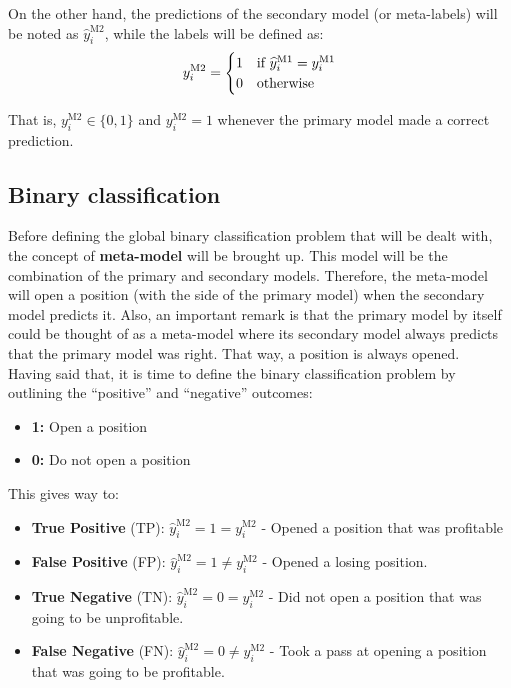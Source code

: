 \documentclass[a4paper]{report}
\begin{document}
On the other hand, the predictions of the secondary model (or meta-labels) 
will be noted as $\widehat{y}_i^{\text{M2}}$, while the labels will be 
defined as:
\begin{equation*}
	y_i^{\text{M2}} =
    \begin{cases}
      1 & \text{if}\ \widehat{y}_i^{\text{M1}} = 
      y_i^{\text{M1}}\\
      \hfill 0 & \text{otherwise} 
    \end{cases}
\end{equation*}

That is, $y_i^{\text{M2}} \in \{0,1\}$ and $y_i^{\text{M2}} = 1$ whenever 
the primary model made a correct prediction.

\subsection{Binary classification}
Before defining the global binary classification problem that will be dealt 
with, the concept of \textbf{meta-model} will be brought up. This model will 
be the combination of the primary and secondary models. Therefore, the 
meta-model will open a position (with the side of the primary model) when 
the secondary model predicts it. Also, an important remark is that the 
primary model by itself could be thought of as a meta-model where its 
secondary model always predicts that the primary model was right. That way, 
a position is always opened.\\

Having said that, it is time to define the binary classification problem by 
outlining the ``positive'' and ``negative'' outcomes:
\begin{itemize}
	\item \textbf{1:} Open a position
	\item \textbf{0:} Do not open a position
\end{itemize}

This gives way to:
\begin{itemize}
	\item \textbf{True Positive} (TP):
	$\widehat{y}^{\text{M2}}_i = 1 = y^{\text{M2}}_i$ - Opened a position 
	that was profitable
		
	\item \textbf{False Positive} (FP): 
	$\widehat{y}^{\text{M2}}_i = 1 \neq y^{\text{M2}}_i$ - Opened a losing 
	position.
	
	\item \textbf{True Negative} (TN):
	$\widehat{y}^{\text{M2}}_i = 0 = y^{\text{M2}}_i$ - Did not open a 
	position that was going to be unprofitable.
	
	\item \textbf{False Negative} (FN): 
	$\widehat{y}^{\text{M2}}_i = 0 \neq y^{\text{M2}}_i$ - Took a pass at 
	opening a position that was going to be profitable.
\end{itemize}
\end{document}
